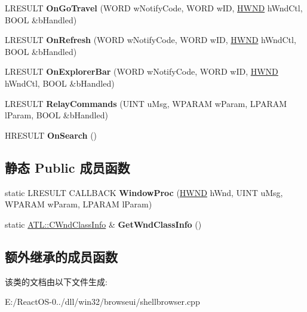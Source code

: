 \begin{DoxyCompactItemize}
\item 
\mbox{\label{class_c_shell_browser_ae1a9d7b3d49fb6ed60c47263e859a961}} 
L\+R\+E\+S\+U\+LT {\bfseries On\+Go\+Travel} (W\+O\+RD w\+Notify\+Code, W\+O\+RD w\+ID, \hyperlink{interfacevoid}{H\+W\+ND} h\+Wnd\+Ctl, B\+O\+OL \&b\+Handled)
\item 
\mbox{\label{class_c_shell_browser_acfd5d205653a31253d0719ee9d94c831}} 
L\+R\+E\+S\+U\+LT {\bfseries On\+Refresh} (W\+O\+RD w\+Notify\+Code, W\+O\+RD w\+ID, \hyperlink{interfacevoid}{H\+W\+ND} h\+Wnd\+Ctl, B\+O\+OL \&b\+Handled)
\item 
\mbox{\label{class_c_shell_browser_afb42a2f26b96f489c57171e7d13f3a3c}} 
L\+R\+E\+S\+U\+LT {\bfseries On\+Explorer\+Bar} (W\+O\+RD w\+Notify\+Code, W\+O\+RD w\+ID, \hyperlink{interfacevoid}{H\+W\+ND} h\+Wnd\+Ctl, B\+O\+OL \&b\+Handled)
\item 
\mbox{\label{class_c_shell_browser_a33eab90908404ddf445ce01e9baa8854}} 
L\+R\+E\+S\+U\+LT {\bfseries Relay\+Commands} (U\+I\+NT u\+Msg, W\+P\+A\+R\+AM w\+Param, L\+P\+A\+R\+AM l\+Param, B\+O\+OL \&b\+Handled)
\item 
\mbox{\label{class_c_shell_browser_a576e897312fb8630e0ddb09a649c069f}} 
H\+R\+E\+S\+U\+LT {\bfseries On\+Search} ()
\end{DoxyCompactItemize}
\subsection*{静态 Public 成员函数}
\begin{DoxyCompactItemize}
\item 
\mbox{\label{class_c_shell_browser_a83a918d926bb7fc0a1cb90dec8e4e0d5}} 
static L\+R\+E\+S\+U\+LT C\+A\+L\+L\+B\+A\+CK {\bfseries Window\+Proc} (\hyperlink{interfacevoid}{H\+W\+ND} h\+Wnd, U\+I\+NT u\+Msg, W\+P\+A\+R\+AM w\+Param, L\+P\+A\+R\+AM l\+Param)
\item 
\mbox{\label{class_c_shell_browser_adca4612326b3d9545c70d2e6d745f89c}} 
static \hyperlink{struct_a_t_l_1_1___a_t_l___w_n_d_c_l_a_s_s_i_n_f_o_w}{A\+T\+L\+::\+C\+Wnd\+Class\+Info} \& {\bfseries Get\+Wnd\+Class\+Info} ()
\end{DoxyCompactItemize}
\subsection*{额外继承的成员函数}


该类的文档由以下文件生成\+:\begin{DoxyCompactItemize}
\item 
E\+:/\+React\+O\+S-\/0../dll/win32/browseui/shellbrowser.\+cpp\end{DoxyCompactItemize}
